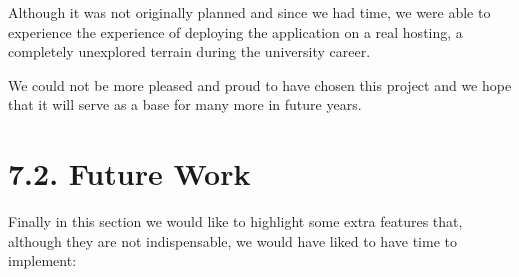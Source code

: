     Although it was not originally planned and since we had time, we were able to experience the experience of deploying the application on a real hosting, a completely unexplored terrain during the university career. \newline
   
    We could not be more pleased and proud to have chosen this project and we hope that it will serve as a base for many more in future years. \newpage
    
 \section*{7.2. Future Work}
      
Finally in this section we would like to highlight some extra features that, although they are not indispensable, we would have liked to have time to implement:
 \newline
 
